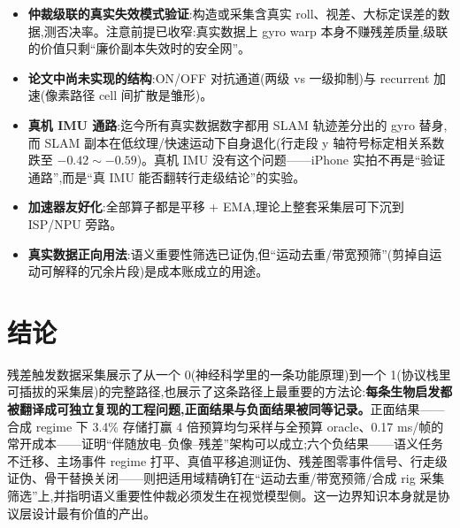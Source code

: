 \documentclass[UTF8,12pt,a4paper]{ctexart}
\begin{document}
\begin{itemize}
  \item \textbf{仲裁级联的真实失效模式验证}:构造或采集含真实 roll、视差、大标定误差的数据,测否决率。注意前提已收窄:真实数据上 gyro warp 本身不赚残差质量,级联的价值只剩``廉价副本失效时的安全网''。
  \item \textbf{论文中尚未实现的结构}:ON/OFF 对抗通道(两级 vs 一级抑制)与 recurrent 加速(像素路径 cell 间扩散是雏形)。
  \item \textbf{真机 IMU 通路}:迄今所有真实数据数字都用 SLAM 轨迹差分出的 gyro 替身,而 SLAM 副本在低纹理/快速运动下自身退化(行走段 y 轴符号标定相关系数跌至 $-0.42 \sim -0.59$)。真机 IMU 没有这个问题——iPhone 实拍不再是``验证通路'',而是``真 IMU 能否翻转行走级结论''的实验。
  \item \textbf{加速器友好化}:全部算子都是平移 + EMA,理论上整套采集层可下沉到 ISP/NPU 旁路。
  \item \textbf{真实数据正向用法}:语义重要性筛选已证伪,但``运动去重/带宽预筛''(剪掉自运动可解释的冗余片段)是成本账成立的用途。
\end{itemize}

\section*{结论}

残差触发数据采集展示了从一个 0(神经科学里的一条功能原理)到一个 1(协议栈里可插拔的采集层)的完整路径,也展示了这条路径上最重要的方法论:\textbf{每条生物启发都被翻译成可独立复现的工程问题,正面结果与负面结果被同等记录。}正面结果——合成 regime 下 3.4\% 存储打赢 4 倍预算均匀采样与全预算 oracle、0.17 ms/帧的常开成本——证明``伴随放电--负像--残差''架构可以成立;六个负结果——语义任务不迁移、主场事件 regime 打平、真值平移追测证伪、残差图零事件信号、行走级证伪、骨干替换关闭——则把适用域精确钉在``运动去重/带宽预筛/合成 rig 采集筛选''上,并指明语义重要性仲裁必须发生在视觉模型侧。这一边界知识本身就是协议层设计最有价值的产出。
\end{document}
